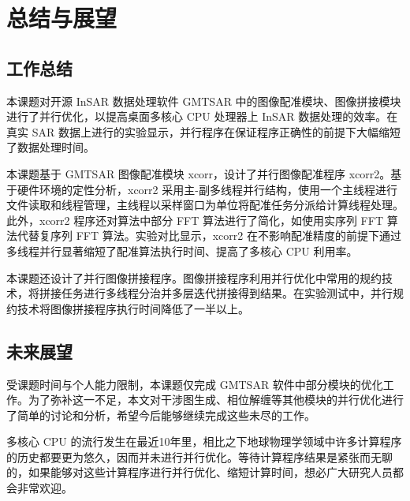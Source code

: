 \chapter{总结与展望}

\section{工作总结}

本课题对开源 InSAR 数据处理软件 GMTSAR 中的图像配准模块、图像拼接模块进行了并行优化，以提高桌面多核心 CPU 处理器上 InSAR 数据处理的效率。在真实 SAR 数据上进行的实验显示，并行程序在保证程序正确性的前提下大幅缩短了数据处理时间。

本课题基于 GMTSAR 图像配准模块 xcorr，设计了并行图像配准程序 xcorr2。基于硬件环境的定性分析，xcorr2 采用主-副多线程并行结构，使用一个主线程进行文件读取和线程管理，主线程以采样窗口为单位将配准任务分派给计算线程处理。此外，xcorr2 程序还对算法中部分 FFT 算法进行了简化，如使用实序列 FFT 算法代替复序列 FFT 算法。实验对比显示，xcorr2 在不影响配准精度的前提下通过多线程并行显著缩短了配准算法执行时间、提高了多核心 CPU 利用率。

本课题还设计了并行图像拼接程序。图像拼接程序利用并行优化中常用的规约技术，将拼接任务进行多线程分治并多层迭代拼接得到结果。在实验测试中，并行规约技术将图像拼接程序执行时间降低了一半以上。

\section{未来展望}

受课题时间与个人能力限制，本课题仅完成 GMTSAR 软件中部分模块的优化工作。为了弥补这一不足，本文对干涉图生成、相位解缠等其他模块的并行优化进行了简单的讨论和分析，希望今后能够继续完成这些未尽的工作。

多核心 CPU 的流行发生在最近10年里，相比之下地球物理学领域中许多计算程序的历史都要更为悠久，因而并未进行并行优化。等待计算程序结果是紧张而无聊的，如果能够对这些计算程序进行并行优化、缩短计算时间，想必广大研究人员都会非常欢迎。

